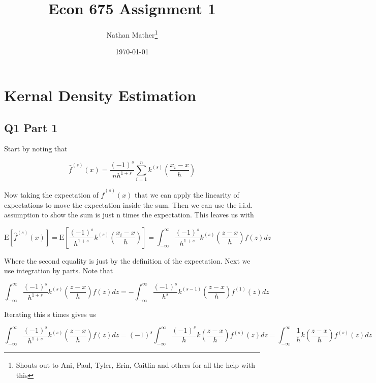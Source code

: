 \documentclass[11pt]{article}
\title{Econ 675 Assignment 1} %
\author{Nathan Mather\thanks{Shouts out to Ani, Paul, Tyler, Erin, Caitlin and others for all the help with this } } %
\date{\today} %
\newcommand{\E}{\mathrm{E}}
\begin{document}
	
\maketitle %

\setcounter{tocdepth}{2} %

\tableofcontents %


\section{Kernal Density Estimation}
\subsection{Q1 Part 1}

Start by noting that 

$$ \hat{f}^{(s)}(x) = \frac{(-1)^s}{nh^{1+s}} \sum_{i=1}^{n}k^{(s)} \left( \frac{{x}_i - x}{h} \right) 
$$

Now taking the expectation of $\hat{f}^{(s)}(x)$ that we can apply the linearity of expectations to move the expectation inside the sum. Then we can use the i.i.d. assumption to show the sum is just n times the expectation. This leaves us with 

$$  \E[\hat{f}^{(s)}(x)] = \E \left[ \frac{(-1)^s}{h^{1+s}} k^{(s)} \left( \frac{{x}_i - x}{h} \right)  \right]
= \int_{-\infty}^{\infty} \frac{(-1)^s}{h^{1+s}} k^{(s)} \left( \frac{z - x}{h} \right)f(z)dz
$$



Where the second equality is just by the definition of the expectation. Next we use integration by parts. Note that 

$$\int_{-\infty}^{\infty} \frac{(-1)^s}{h^{1+s}} k^{(s)} \left( \frac{z - x}{h} \right)f(z)dz = -\int_{-\infty}^{\infty} \frac{(-1)^s}{h^{s}} k^{(s-1)} \left( \frac{z - x}{h} \right)f^{(1)}(z)dz
$$

Iterating this s times gives us

$$\int_{-\infty}^{\infty} \frac{(-1)^s}{h^{1+s}} k^{(s)} \left( \frac{z - x}{h} \right)f(z)dz
=  (-1)^s \int_{-\infty}^{\infty} \frac{(-1)^s}{h} k \left( \frac{z - x}{h} \right)f^{(s)}(z)dz
= \int_{-\infty}^{\infty} \frac{1}{h} k \left( \frac{z - x}{h} \right)f^{(s)}(z)dz
$$
\end{document}
